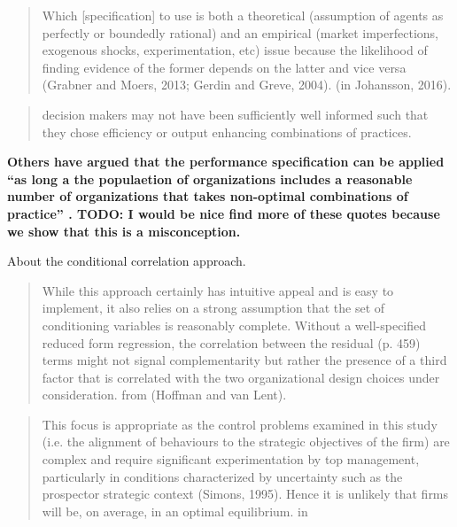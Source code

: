 \documentclass[12pt]{article}
\begin{document}
\begin{quote}
Which {[}specification{]} to use is both a theoretical (assumption of agents as perfectly or boundedly rational) and an empirical (market imperfections, exogenous shocks, experimentation, etc) issue because the likelihood of finding evidence of the former depends on the latter and vice versa (Grabner and Moers, 2013; Gerdin and Greve, 2004). (in Johansson, 2016).
\end{quote}

\begin{quote}
decision makers may not have been sufficiently well informed such that they chose efficiency or output enhancing combinations of practices.
\citep{Carree2011}
\end{quote}

\textbf{Others have argued that the performance specification can be applied ``as long a the populaetion of organizations includes a reasonable number of organizations that takes non-optimal combinations of practice'' \citep{Carree2011}. TODO: I would be nice find more of these quotes because we show that this is a misconception.}

About the conditional correlation approach.
\begin{quote}
While this approach certainly has intuitive appeal and is easy to implement, it also relies on a strong assumption that the set of conditioning variables is reasonably complete. Without a well-specified reduced form regression, the correlation between the residual (p. 459) terms might not signal complementarity but rather the presence of a third factor that is correlated with the two organizational design choices under consideration. from (Hoffman and van Lent).
\end{quote}

\begin{quote}
This focus is appropriate as the control problems examined in this study (i.e. the alignment of behaviours to the strategic objectives of the firm) are complex and require significant experimentation by top management, particularly in conditions characterized by uncertainty such as the prospector strategic context (Simons, 1995). Hence it is unlikely that firms will be, on average, in an optimal equilibrium. in \citep{Bedford2016}
\end{quote}

\newpage



\end{document}
